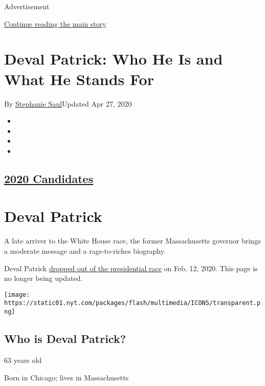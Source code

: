 Advertisement

\protect\hyperlink{after-top}{Continue reading the main story}

\hypertarget{deval-patrick-who-he-is-and-what-he-stands-for}{%
\section{Deval Patrick: Who He Is and What He Stands
For}\label{deval-patrick-who-he-is-and-what-he-stands-for}}

By \href{https://www.nytimes.com/by/stephanie-saul}{Stephanie
Saul}Updated Apr 27, 2020

\begin{itemize}
\item
\item
\item
\item
\end{itemize}

\hypertarget{2020-candidates-}{%
\subsection{\texorpdfstring{\href{https://www.nytimes.com/interactive/2019/us/politics/2020-presidential-candidates.html}{2020
Candidates} }{2020 Candidates }}\label{2020-candidates-}}

\hypertarget{deval-patrick}{%
\section{Deval Patrick}\label{deval-patrick}}

A late arriver to the White House race, the former Massachusetts
governor brings a moderate message and a rags-to-riches biography.

Deval Patrick
\href{https://www.nytimes.com/2020/02/12/us/politics/deval-patrick-drops-out.html}{dropped
out of the presidential race} on Feb. 12, 2020. This page is no longer
being updated.

\texttt{[image: https://static01.nyt.com/packages/flash/multimedia/ICONS/transparent.png]}

\hypertarget{who-is-deval-patrick}{%
\subsection{Who is Deval Patrick?}\label{who-is-deval-patrick}}

63 years old

Born in Chicago; lives in Massachusetts

